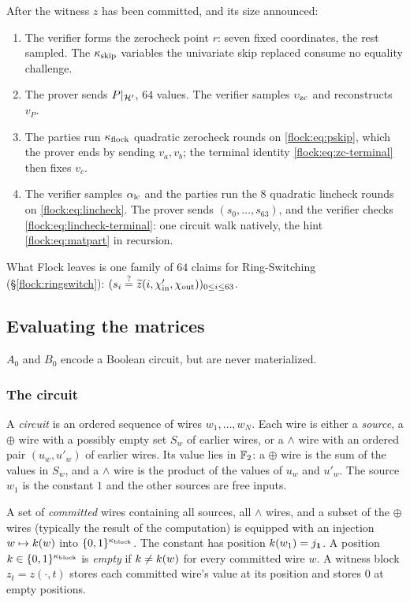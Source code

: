 \begin{protocol}\label{flock:protocol}
After the witness $z$ has been committed, and its size announced:
\begin{enumerate}
\item The verifier forms the zerocheck point $r$: seven fixed coordinates, the rest sampled. The $\kappa_{\mathrm{skip}}$ variables the univariate skip replaced consume no equality challenge.
\item The prover sends $P|_{\mathcal{H}'}$, $64$ values. The verifier samples $\upsilon_{\mathrm{zc}}$ and reconstructs $v_P$.
\item The parties run $\kappa_{\mathrm{flock}}$ quadratic zerocheck rounds on \eqref{flock:eq:pskip}, which the prover ends by sending $v_a,v_b$; the terminal identity \eqref{flock:eq:zc-terminal} then fixes $v_c$.
\item The verifier samples $\alpha_{\mathrm{lc}}$ and the parties run the $8$ quadratic lincheck rounds on \eqref{flock:eq:lincheck}. The prover sends $(s_0,\ldots,s_{63})$, and the verifier checks \eqref{flock:eq:lincheck-terminal}: one circuit walk natively, the hint \eqref{flock:eq:matpart} in recursion.
\end{enumerate}
What Flock leaves is one family of $64$ claims for Ring-Switching (\S\ref{flock:ringswitch}): $(s_i \stackrel{?}{=} \widetilde{z}(i, \chi'_{\mathrm{in}},\chi_{\mathrm{out}}))_{0 \leq i \leq 63}$.
\end{protocol}

\subsection{Evaluating the matrices}\label{flock:matrices}

$A_0$ and $B_0$ encode a Boolean circuit, but are never materialized.

\subsubsection{The circuit}\label{flock:circuit}

\begin{definition}[Circuit]\label{def:circuit}
A \emph{circuit} is an ordered sequence of wires $w_1,\ldots,w_N$. Each wire is either a \emph{source}, a $\oplus$ wire with a possibly empty set $S_w$ of earlier wires, or a $\wedge$ wire with an ordered pair $(u_w,u'_w)$ of earlier wires. Its value lies in $\mathbb{F}_2$: a $\oplus$ wire is the sum of the values in $S_w$, and a $\wedge$ wire is the product of the values of $u_w$ and $u'_w$. The source $w_1$ is the constant $1$ and the other sources are free inputs.

A set of \emph{committed} wires containing all sources, all $\wedge$ wires, and a subset of the $\oplus$ wires (typically the result of the computation) is equipped with an injection $w\mapsto k(w)$ into $\{0,1\}^{\kappa_{\mathrm{block}}}$. The constant has position $k(w_1)=j_{\mathbf{1}}$. A position $k\in\{0,1\}^{\kappa_{\mathrm{block}}}$ is \emph{empty} if $k\neq k(w)$ for every committed wire $w$. A witness block $z_t=z(\cdot,t)$ stores each committed wire's value at its position and stores $0$ at empty positions.
\end{definition}

